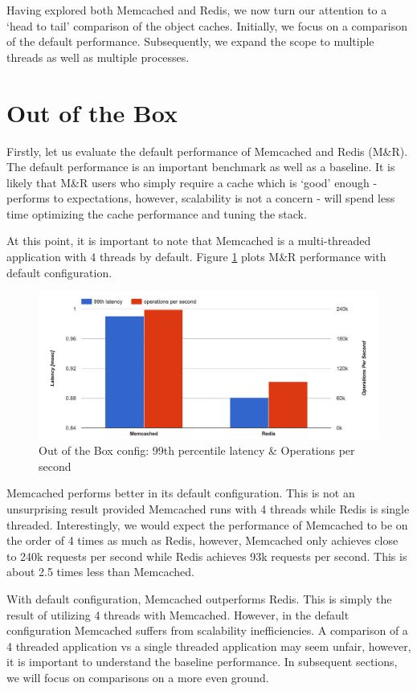 Having explored both Memcached and Redis, we now turn our attention to a `head to tail' comparison of the object caches. Initially, we focus on a comparison of the default performance. Subsequently, we expand the scope to multiple threads as well as multiple processes.


\section{Out of the Box}

Firstly, let us evaluate the default performance of Memcached and Redis (M\&R). The default performance is an important benchmark as well as a baseline. It is likely that M\&R users who simply require a cache which is `good' enough - performs to expectations, however, scalability is not a concern - will spend less time optimizing the cache performance and tuning the stack.

At this point, it is important to note that Memcached is a multi-threaded application with 4 threads by default. Figure \ref{fig:mr_default} plots M\&R performance with default configuration.

\begin{figure}[h]
    \includegraphics[width=\textwidth]{./res2/mr_default.png}
    \caption{Out of the Box config: 99th percentile latency \& Operations per second}
    \label{fig:mr_default}
\end{figure}

Memcached performs better in its default configuration. This is not an unsurprising result provided Memcached runs with 4 threads while Redis is single threaded. Interestingly, we would expect the performance of Memcached to be on the order of 4 times as much as Redis, however, Memcached only achieves close to 240k requests per second while Redis achieves 93k requests per second. This is about 2.5 times less than Memcached.

With default configuration, Memcached outperforms Redis. This is simply the result of utilizing 4 threads with Memcached. However, in the default configuration Memcached suffers from scalability inefficiencies. A comparison of a 4 threaded application vs a single threaded application may seem unfair, however, it is important to understand the baseline performance. In subsequent sections, we will focus on comparisons on a more even ground.

